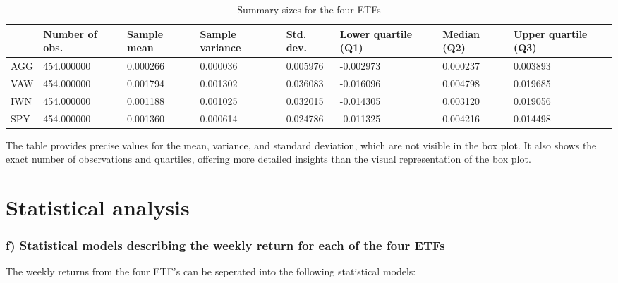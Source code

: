\documentclass{rapport}
\begin{document}
\begin{table}[H]  %
    \centering  %
    \begin{tabularx}{\textwidth}{lXXXXXXX}
    \toprule
         & Number of obs. & Sample mean & Sample variance & Std. dev. & Lower quartile (Q1) & Median (Q2) & Upper quartile (Q3) \\
    \midrule
        AGG & 454.000000 & 0.000266 & 0.000036 & 0.005976 &  -0.002973  & 0.000237 & 0.003893 \\
        VAW & 454.000000 & 0.001794 & 0.001302 & 0.036083 &  -0.016096  & 0.004798 & 0.019685 \\
        IWN & 454.000000 & 0.001188 & 0.001025 & 0.032015 &  -0.014305  & 0.003120 & 0.019056 \\
        SPY & 454.000000 & 0.001360 & 0.000614 & 0.024786 &  -0.011325  & 0.004216 & 0.014498 \\
    \bottomrule
    \end{tabularx}
    \caption{Summary sizes for the four ETFs}  %
\end{table}




The table provides precise values for the mean, variance, and standard deviation, which are not visible in the box plot. 
It also shows the exact number of observations and quartiles, offering more detailed insights than the visual representation of the box plot.





\pagebreak
\section{Statistical analysis}
\subsubsection*{\textbf{f)} Statistical models describing the weekly return for each of the
four ETFs}

The weekly returns from the four ETF's can be seperated into the following statistical models:
\end{document}
